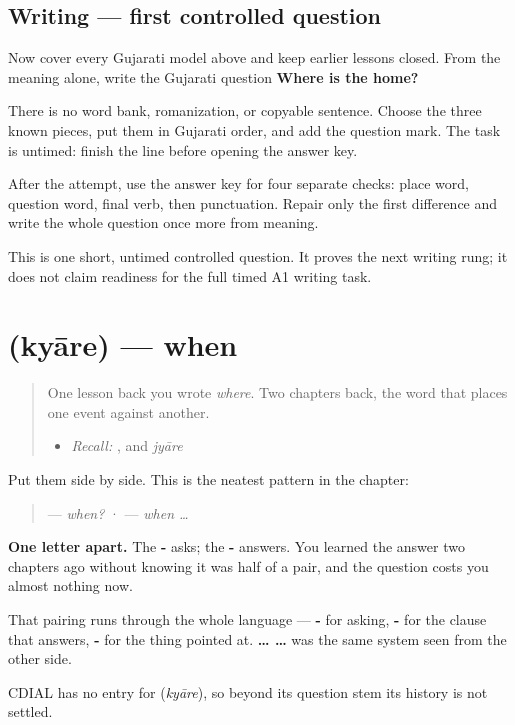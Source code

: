 \subsection*{Writing — first controlled question}
Now cover every Gujarati model above and keep earlier lessons closed. From the meaning alone, write the Gujarati question \textbf{Where is the home?}

There is no word bank, romanization, or copyable sentence. Choose the three known pieces, put them in Gujarati order, and add the question mark. The task is untimed: finish the line before opening the answer key.

\begin{tcolorbox}[breakable,colback=teal!4,colframe=teal!35!black,title={Before you move on}]
After the attempt, use the answer key for four separate checks: place word, question word, final verb, then punctuation. Repair only the first difference and write the whole question once more from meaning.

This is one short, untimed controlled question. It proves the next writing rung; it does not claim readiness for the full timed A1 writing task.
\end{tcolorbox}
\section[\texorpdfstring{\gu{ક્યારે} (kyāre)}{ક્યારે (kyāre)}]{ (kyāre) — when}

\label{lesson:GU-C37-kyaare}



\begin{quote}
One lesson back you wrote \emph{where}. Two chapters back, the word that places one event against another.

\begin{itemize}
\raggedright
  \item \emph{Recall:} \textbf{}, and \emph{jyāre}
\end{itemize}
\end{quote}

\begin{cousinweb}
Put them side by side. This is the neatest pattern in the chapter:

\begin{quote}
\textbf{} — \emph{when?} · \textbf{} — \emph{when …}
\end{quote}

\textbf{One letter apart.} The \textbf{-} asks; the \textbf{-} answers. You learned the answer two chapters ago without knowing it was half of a pair, and the question costs you almost nothing now.

That pairing runs through the whole language — \textbf{-} for asking, \textbf{-} for the clause that answers, \textbf{-} for the thing pointed at. \textbf{ …  …} was the same system seen from the other side.

CDIAL has no entry for \textbf{} (\emph{kyāre}), so beyond its question stem its history is not settled.
\end{cousinweb}

